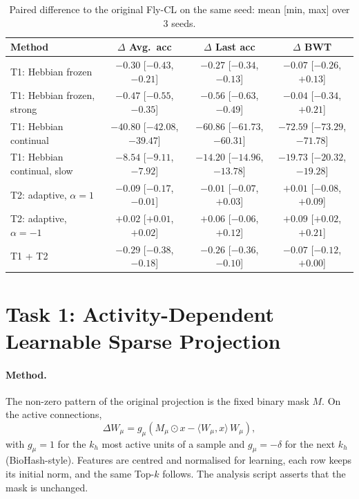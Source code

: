 \documentclass[11pt,a4paper]{article}
\begin{document}
\begin{table}[h]
\centering
\caption{Paired difference to the original Fly-CL on the same seed: mean [min, max] over 3 seeds.}
\label{tab:paired}
\small
\begin{tabular}{lccc}
\toprule
Method & $\Delta$ Avg.\ acc & $\Delta$ Last acc & $\Delta$ BWT \\
\midrule
T1: Hebbian frozen            & $-0.30$ [$-0.43$, $-0.21$] & $-0.27$ [$-0.34$, $-0.13$] & $-0.07$ [$-0.26$, $+0.13$] \\
T1: Hebbian frozen, strong    & $-0.47$ [$-0.55$, $-0.35$] & $-0.56$ [$-0.63$, $-0.49$] & $-0.04$ [$-0.34$, $+0.21$] \\
T1: Hebbian continual         & $-40.80$ [$-42.08$, $-39.47$] & $-60.86$ [$-61.73$, $-60.31$] & $-72.59$ [$-73.29$, $-71.78$] \\
T1: Hebbian continual, slow   & $-8.54$ [$-9.11$, $-7.92$] & $-14.20$ [$-14.96$, $-13.78$] & $-19.73$ [$-20.32$, $-19.28$] \\
T2: adaptive, $\alpha = 1$    & $-0.09$ [$-0.17$, $-0.01$] & $-0.01$ [$-0.07$, $+0.03$] & $+0.01$ [$-0.08$, $+0.09$] \\
T2: adaptive, $\alpha = -1$   & $+0.02$ [$+0.01$, $+0.02$] & $+0.06$ [$-0.06$, $+0.12$] & $+0.09$ [$+0.02$, $+0.21$] \\
T1 + T2                       & $-0.29$ [$-0.38$, $-0.18$] & $-0.26$ [$-0.36$, $-0.10$] & $-0.07$ [$-0.12$, $+0.00$] \\
\bottomrule
\end{tabular}
\end{table}

\section{Task 1: Activity-Dependent Learnable Sparse Projection}

\paragraph{Method.} The non-zero pattern of the original projection is the fixed binary mask $M$.
On the active connections,
\[
\Delta W_\mu = g_\mu \left( M_\mu \odot x - \langle W_\mu, x\rangle\, W_\mu \right),
\]
with $g_\mu = 1$ for the $k_h$ most active units of a sample and $g_\mu = -\delta$ for the next
$k_h$ (BioHash-style). Features are centred and normalised for learning, each row keeps its
initial norm, and the same Top-$k$ follows. The analysis script asserts that the mask is unchanged.
\end{document}
